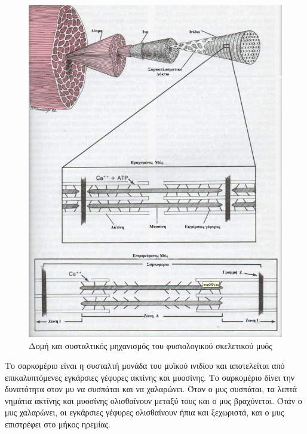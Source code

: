 \begin{figure}[H]
    \centering
    \includegraphics[width=.7\textwidth, height=0.5\textheight]{musculoskeletal/fig/muscle-fysiology2.png}
    \caption{Δομή και συσταλτικός μηχανισμός του φυσιολογικού σκελετικού μυός\protect\footnotemark}
    \label{fig:muscle-fysiology2}
\end{figure}

Το σαρκομέριο είναι η συσταλτή μονάδα του μυϊκού ινιδίου και αποτελείται από επικαλυπτόμενες εγκάρσιες γέφυρες ακτίνης και μυοσίνης. Το σαρκομέριο δίνει την δυνατότητα στον μυ να συσπάται και να χαλαρώνει. Όταν ο μυς συσπάται, τα λεπτά νημάτια ακτίνης και μυοσίνης ολισθαίνουν μεταξύ τους και ο μυς βραχύνεται. Όταν ο μυς χαλαρώνει, οι εγκάρσιες γέφυρες ολισθαίνουν ήπια και ξεχωριστά, και ο μυς επιστρέφει στο μήκος ηρεμίας.

